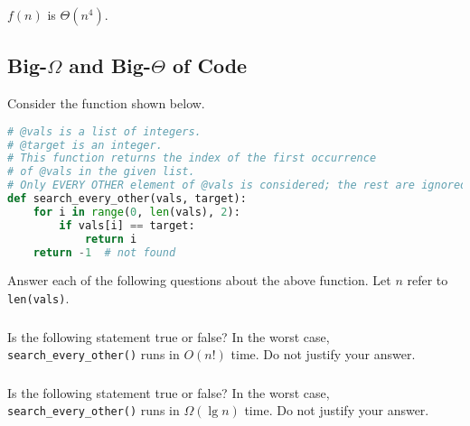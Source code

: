 \documentclass{article}
\begin{document}
\subsubsection{}

$f(n)$ is $\Theta(n^4)$.

\begin{mdframed}
\vspace{3em}
\end{mdframed}

\subsection{Big-$\Omega$ and Big-$\Theta$ of Code}

Consider the function shown below.

\begin{lstlisting}[language=Python]
# @vals is a list of integers.
# @target is an integer.
# This function returns the index of the first occurrence
# of @vals in the given list.
# Only EVERY OTHER element of @vals is considered; the rest are ignored.
def search_every_other(vals, target):
    for i in range(0, len(vals), 2):
        if vals[i] == target:
            return i
    return -1  # not found
\end{lstlisting}

Answer each of the following questions about the above function. Let $n$ refer to \lstinline{len(vals)}.

\subsubsection{}

Is the following statement true or false? In the worst case, \lstinline{search_every_other()} runs in $O(n!)$ time. Do not justify your answer.

\begin{mdframed}
\vspace{3em}
\end{mdframed}

\subsubsection{}

Is the following statement true or false? In the worst case, \lstinline{search_every_other()} runs in $\Omega(\lg n)$ time. Do not justify your answer.

\begin{mdframed}
\vspace{3em}
\end{mdframed}
\end{document}

